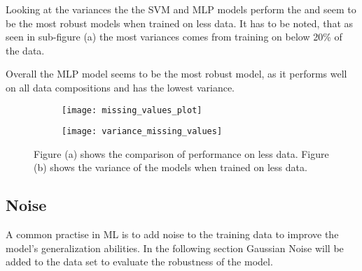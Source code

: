 Looking at the variances the the \ac{SVM} and \ac{MLP} models perform the and seem to be the most
robust models when trained on less data.
It has to be noted, that as seen in sub-figure (a) the most variances comes from training on
below 20\% of the data.

Overall the \ac{MLP} model seems to be the most robust model, as it performs well on all data
compositions and has the lowest variance.

\begin{figure}[H]
    \begin{tcolorbox}[arc=0pt,boxrule=0.5pt]
        \centering
        \begin{subfigure}{0.4\textwidth}
            \texttt{[image: missing\_values\_plot]}
            \caption{}
            \label{fig:first}
        \end{subfigure}
        \hfill
        \begin{subfigure}{0.4\textwidth}
            \texttt{[image: variance\_missing\_values]}
            \caption{}
            \label{fig:second}
        \end{subfigure}
        \hfill
        \label{fig:results-missing-values}
    \end{tcolorbox}
    \caption{Figure (a) shows the comparison of performance on less data. Figure (b) shows the
    variance of the models when trained on less data.}
\end{figure}


%

\subsection{Noise}\label{subsec:noise}
A common practise in \ac{ML} is to add noise to the training data to improve
the model's generalization abilities.
In the following section Gaussian Noise will be added to the data set to evaluate the robustness
of the model.

